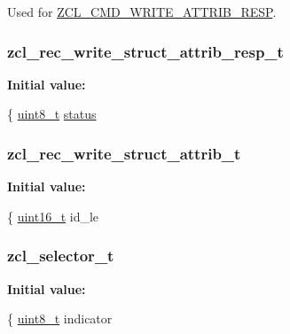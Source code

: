 Used for \hyperlink{group__zcl_ga0595c0f6957be4e80265ecd36158c0ae}{Z\-C\-L\-\_\-\-C\-M\-D\-\_\-\-W\-R\-I\-T\-E\-\_\-\-A\-T\-T\-R\-I\-B\-\_\-\-R\-E\-S\-P}. 

\hypertarget{group__zcl_ga6115997e4149a38764e0ecdd8e2828d1}{
\subsubsection[{zcl\-\_\-rec\-\_\-write\-\_\-struct\-\_\-attrib\-\_\-resp\-\_\-t}]{\setlength{\rightskip}{0pt plus 5cm}zcl\-\_\-rec\-\_\-write\-\_\-struct\-\_\-attrib\-\_\-resp\-\_\-t}}\label{group__zcl_ga6115997e4149a38764e0ecdd8e2828d1}
{\bfseries Initial value\-:}
\begin{DoxyCode}
\{
   \hyperlink{group__hal_gae1affc9ca37cfb624959c866a73f83c2}{uint8\_t}       \hyperlink{group__xbee__atcmd_gade818037fd6c985038ff29656089758d}{status}
\end{DoxyCode}
\hypertarget{group__zcl_ga0bcadc9c7f337bea7b7eaf1ec6dd0a28}{
\subsubsection[{zcl\-\_\-rec\-\_\-write\-\_\-struct\-\_\-attrib\-\_\-t}]{\setlength{\rightskip}{0pt plus 5cm}zcl\-\_\-rec\-\_\-write\-\_\-struct\-\_\-attrib\-\_\-t}}\label{group__zcl_ga0bcadc9c7f337bea7b7eaf1ec6dd0a28}
{\bfseries Initial value\-:}
\begin{DoxyCode}
\{
   \hyperlink{group__hal_ga5a8b2dc9e45a9ee81a94ef304fb62505}{uint16\_t}        id\_le
\end{DoxyCode}
\hypertarget{group__zcl_ga38527c36b75dbd4dadd7aec7eb9b8c6d}{
\subsubsection[{zcl\-\_\-selector\-\_\-t}]{\setlength{\rightskip}{0pt plus 5cm}zcl\-\_\-selector\-\_\-t}}\label{group__zcl_ga38527c36b75dbd4dadd7aec7eb9b8c6d}
{\bfseries Initial value\-:}
\begin{DoxyCode}
\{
   \hyperlink{group__hal_gae1affc9ca37cfb624959c866a73f83c2}{uint8\_t} indicator
\end{DoxyCode}


